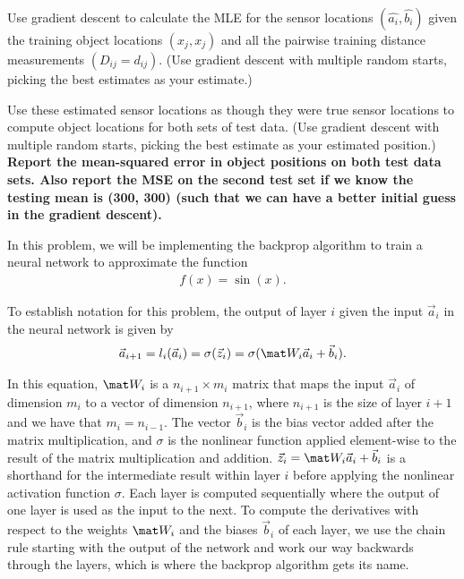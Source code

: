 \documentclass[preview]{standalone}
\begin{document}
\begin{Parts}
Use gradient descent to calculate the MLE for the sensor locations $(\hat{a_i},\hat{b_i})$
given the training object locations $(x_j,x_j)$ and all the pairwise
training distance measurements $(D_{ij}=d_{ij})$. (Use gradient
descent with multiple random starts, picking the best estimates as
your estimate.)

Use these estimated sensor locations as though they were true sensor
locations to compute object locations for both sets of test data. (Use
gradient descent with multiple random starts, picking the best
estimate as your estimated position.) {\bf Report the mean-squared
  error in object positions on both test data sets. Also report the MSE on the second test set if we know the testing mean is (300, 300) (such that we can have a better initial guess in the gradient descent). }



\end{Parts}


In this problem, we will be implementing the backprop algorithm to train a neural network to approximate the function
\begin{align*}
f(x) = \sin(x).
\end{align*}

To establish notation for this problem, the output of layer $i$ given the input $\vec a_i$ in the neural network is given by
\begin{align*}
\vec a_{i+1} = l_i(\vec a_i) = \sigma(\vec z_i) = \sigma(\mat W_i\vec a_i+\vec b_i).
\end{align*}

In this equation, $\mat W_i$ is a $n_{i+1}\times m_i$ matrix that maps the input $\vec a_i$ of dimension $m_i$ to a vector of dimension $n_{i+1}$, where $n_{i+1}$ is the size of layer $i+1$ and we have that $m_i=n_{i-1}$.  The vector $\vec{b}_i$ is the bias vector added after the matrix multiplication, and $\sigma$ is the nonlinear function applied element-wise to the result of the matrix multiplication and addition.  $\vec z_i = \mat W_i\vec a_i +\vec{b}_i$ is a shorthand for the intermediate result within layer $i$ before applying the nonlinear activation function $\sigma$. Each layer is computed sequentially where the output of one layer is used as the input to the next.  To compute the derivatives with respect to the weights $\mat W_i$ and the biases $\vec{b}_i$ of each layer, we use the chain rule starting with the output of the network and work our way backwards through the layers, which is where the backprop algorithm gets its name.
\end{document}

